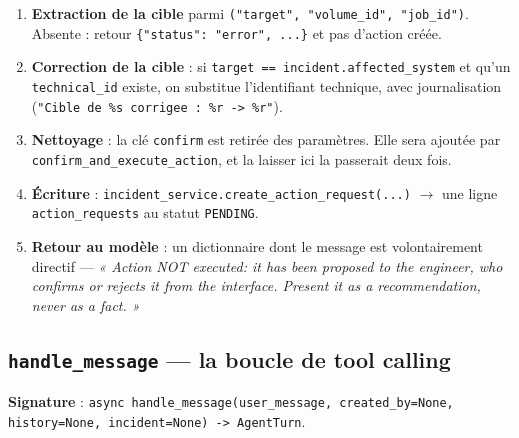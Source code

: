\documentclass[11pt,a4paper]{report}
\newcommand{\fn}[1]{\texttt{\small\textcolor{oasisviolet}{#1}}}
\newcommand{\tbl}[1]{\texttt{\small\textcolor{oasisamber}{#1}}}
\newcommand{\arrowto}{\ensuremath{\rightarrow}}
\begin{document}
\begin{enumerate}
  \item \textbf{Extraction de la cible} parmi \texttt{("target", "volume\_id",
  "job\_id")}. Absente : retour \texttt{\{"status": "error", ...\}} et pas
  d'action créée.
  \item \textbf{Correction de la cible} : si \texttt{target ==
  incident.affected\_system} et qu'un \fn{technical\_id} existe, on substitue
  l'identifiant technique, avec journalisation
  (\texttt{"Cible de \%s corrigee : \%r -> \%r"}).
  \item \textbf{Nettoyage} : la clé \texttt{confirm} est retirée des paramètres.
  Elle sera ajoutée par \fn{confirm\_and\_execute\_action}, et la laisser ici la
  passerait deux fois.
  \item \textbf{Écriture} : \fn{incident\_service.create\_action\_request(...)}
  \arrowto{} une ligne \tbl{action\_requests} au statut \texttt{PENDING}.
  \item \textbf{Retour au modèle} : un dictionnaire dont le message est
  volontairement directif ---
  \emph{« Action NOT executed: it has been proposed to the engineer, who
  confirms or rejects it from the interface. Present it as a recommendation,
  never as a fact. »}
\end{enumerate}

\subsection{\fn{handle\_message} --- la boucle de tool calling}

\textbf{Signature} : \fn{async handle\_message(user\_message, created\_by=None,
history=None, incident=None) -> AgentTurn}.
\end{document}
